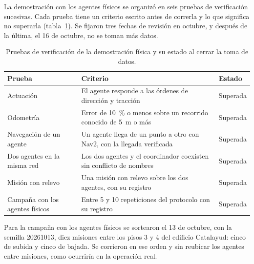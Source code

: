 La demostración con los agentes físicos se organizó en seis pruebas de verificación
sucesivas. Cada prueba tiene un criterio escrito antes de correrla y lo que
significa no superarla (tabla~\ref{tab:pruebas-verificacion}). Se fijaron tres
fechas de revisión en octubre, y después de la última, el 16 de octubre, no se
toman más datos.

\begin{table}[htbp]
  \centering\small
  \caption{Pruebas de verificación de la demostración física y su estado al
    cerrar la toma de datos.}
  \label{tab:pruebas-verificacion}
  \begin{tabular}{@{}p{}p{}p{}@{}}
    \toprule
    \textbf{Prueba} & \textbf{Criterio} & \textbf{Estado} \\ \midrule
    Actuación & El agente responde a las órdenes de dirección y tracción & Superada \\ \addlinespace
    Odometría & Error de 10~\% o menos sobre un recorrido conocido de 5~m o más & Superada \\ \addlinespace
    Navegación de un agente & Un agente llega de un punto a otro con Nav2, con la llegada verificada & Superada \\ \addlinespace
    Dos agentes en la misma red & Los dos agentes y el coordinador coexisten sin conflicto de nombres & Superada \\ \addlinespace
    Misión con relevo & Una misión con relevo sobre los dos agentes, con su registro & Superada \\ \addlinespace
    Campaña con los agentes físicos & Entre 5 y 10 repeticiones del protocolo con su registro & Superada \\ \bottomrule
  \end{tabular}
\end{table}

Para la campaña con los agentes físicos se sortearon el 13 de octubre, con la semilla 20261013, diez misiones entre los pisos 3 y 4 del edificio Catalayud: cinco de subida y cinco de bajada. Se corrieron en ese orden y sin reubicar los agentes entre misiones, como ocurriría en la operación real.
